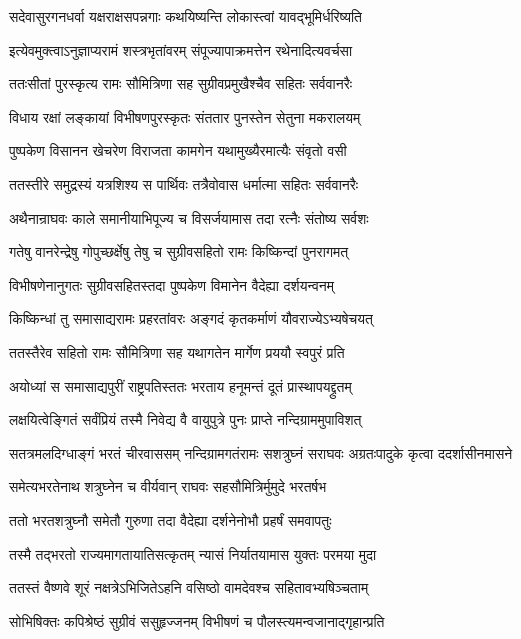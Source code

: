 \twolineshloka
{सदेवासुरगनधर्वा यक्षराक्षसपन्नगाः}
{कथयिष्यन्ति लोकास्त्वां यावद्भूमिर्धरिष्यति}


\twolineshloka
{इत्येवमुक्त्वाऽनुज्ञाप्यरामं शस्त्रभृतांवरम्}
{संपूज्यापाक्रमत्तेन रथेनादित्यवर्चसा}


\twolineshloka
{ततःसीतां पुरस्कृत्य रामः सौमित्रिणा सह}
{सुग्रीवप्रमुखैश्चैव सहितः सर्ववानरैः}


\twolineshloka
{विधाय रक्षां लङ्कायां विभीषणपुरस्कृतः}
{संततार पुनस्तेन सेतुना मकरालयम्}


\twolineshloka
{पुष्पकेण विसानन खेचरेण विराजता}
{कामगेन यथामुख्यैरमात्यैः संवृतो वसी}


\twolineshloka
{ततस्तीरे समुद्रस्यं यत्रशिश्य स पार्थिवः}
{तत्रैवोवास धर्मात्मा सहितः सर्ववानरैः}


\twolineshloka
{अथैनान्राघवः काले समानीयाभिपूज्य च}
{विसर्जयामास तदा रत्नैः संतोष्य सर्वशः}


\twolineshloka
{गतेषु वानरेन्द्रेषु गोपुच्छर्क्षेषु तेषु च}
{सुग्रीवसहितो रामः किष्किन्दां पुनरागमत्}


\twolineshloka
{विभीषणेनानुगतः सुग्रीवसहितस्तदा}
{पुष्पकेण विमानेन वैदेह्या दर्शयन्वनम्}


\twolineshloka
{किष्किन्धां तु समासाद्यरामः प्रहरतांवरः}
{अङ्गदं कृतकर्माणं यौवराज्येऽभ्यषेचयत्}


\twolineshloka
{ततस्तैरेव सहितो रामः सौमित्रिणा सह}
{यथागतेन मार्गेण प्रययौ स्वपुरं प्रति}


\twolineshloka
{अयोध्यां स समासाद्यपुरीं राष्ट्रपतिस्ततः}
{भरताय हनूमन्तं दूतं प्रास्थापयद्द्रुतम्}


\twolineshloka
{लक्षयित्वेङ्गितं सर्वंप्रियं तस्मै निवेद्य वै}
{वायुपुत्रे पुनः प्राप्ते नन्दिग्राममुपाविशत्}


\threelineshloka
{सतत्रमलदिग्धाङ्गं भरतं चीरवाससम्}
{नन्दिग्रामगतंरामः सशत्रुघ्नं सराघवः}
{अग्रतःपादुके कृत्वा ददर्शासीनमासने}


\twolineshloka
{समेत्यभरतेनाथ शत्रुघ्नेन च वीर्यवान्}
{राघवः सहसौमित्रिर्मुमुदे भरतर्षभ}


\twolineshloka
{ततो भरतशत्रुघ्नौ समेतौ गुरुणा तदा}
{वैदेह्या दर्शनेनोभौ प्रहर्षं समवापतुः}


\twolineshloka
{तस्मै तद्भरतो राज्यमागतायातिसत्कृतम्}
{न्यासं निर्यातयामास युक्तः परमया मुदा}


\twolineshloka
{ततस्तं वैष्णवे शूरं नक्षत्रेऽभिजितेऽहनि}
{वसिष्ठो वामदेवश्च सहितावभ्यषिञ्चताम्}


\twolineshloka
{सोभिषिक्तः कपिश्रेष्ठं सुग्रीवं ससुहृज्जनम्}
{विभीषणं च पौलस्त्यमन्वजानाद्गृहान्प्रति}


